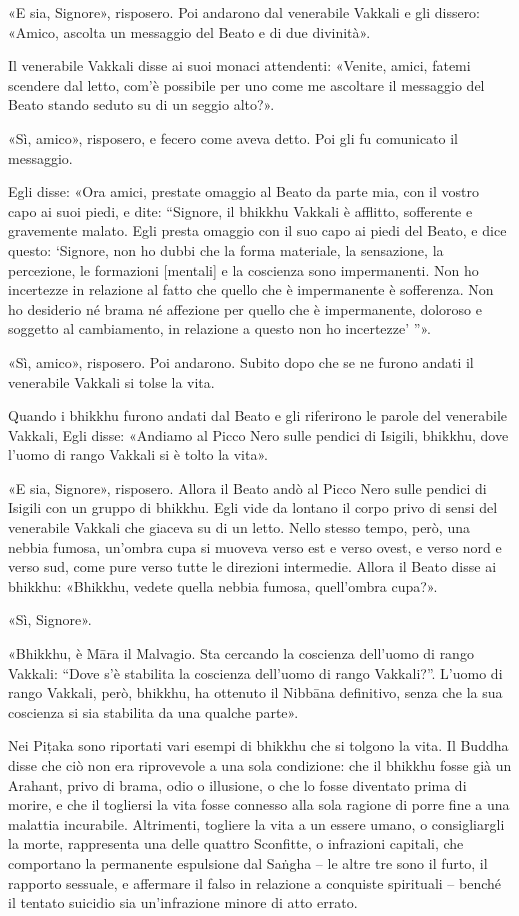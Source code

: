 «E sia, Signore», risposero. Poi andarono dal venerabile Vakkali e gli
dissero: «Amico, ascolta un messaggio del Beato e di due divinità».


Il venerabile Vakkali disse ai suoi monaci attendenti: «Venite, amici,
fatemi scendere dal letto, com’è possibile per uno come me ascoltare il
messaggio del Beato stando seduto su di un seggio alto?».


«Sì, amico», risposero, e fecero come aveva detto. Poi gli fu comunicato
il messaggio.


Egli disse: «Ora amici, prestate omaggio al Beato da parte mia, con il
vostro capo ai suoi piedi, e dite: “Signore, il bhikkhu Vakkali è
afflitto, sofferente e gravemente malato. Egli presta omaggio con il suo
capo ai piedi del Beato, e dice questo: ‘Signore, non ho dubbi che la
forma materiale, la sensazione, la percezione, le formazioni [mentali] e
la coscienza sono impermanenti. Non ho incertezze in relazione al fatto
che quello che è impermanente è sofferenza. Non ho desiderio né brama né
affezione per quello che è impermanente, doloroso e soggetto al
cambiamento, in relazione a questo non ho incertezze’ ”».


«Sì, amico», risposero. Poi andarono. Subito dopo che se ne furono
andati il venerabile Vakkali si tolse la vita.


Quando i bhikkhu furono andati dal Beato e gli riferirono le parole del
venerabile Vakkali, Egli disse: «Andiamo al Picco Nero sulle pendici di
Isigili, bhikkhu, dove l’uomo di rango Vakkali si è tolto la vita».


«E sia, Signore», risposero. Allora il Beato andò al Picco Nero sulle
pendici di Isigili con un gruppo di bhikkhu. Egli vide da lontano il
corpo privo di sensi del venerabile Vakkali che giaceva su di un letto.
Nello stesso tempo, però, una nebbia fumosa, un’ombra cupa si muoveva
verso est e verso ovest, e verso nord e verso sud, come pure verso tutte
le direzioni intermedie. Allora il Beato disse ai bhikkhu: «Bhikkhu,
vedete quella nebbia fumosa, quell’ombra cupa?».


«Sì, Signore».


«Bhikkhu, è Māra il Malvagio. Sta cercando la coscienza dell’uomo di
rango Vakkali: “Dove s’è stabilita la coscienza dell’uomo di rango
Vakkali?”. L’uomo di rango Vakkali, però, bhikkhu, ha ottenuto il
Nibbāna definitivo, senza che la sua coscienza si sia stabilita da una
qualche parte».




 Nei Piṭaka sono riportati vari esempi di bhikkhu che si
tolgono la vita. Il Buddha disse che ciò non era riprovevole a una sola
condizione: che il bhikkhu fosse già un Arahant, privo di brama, odio o
illusione, o che lo fosse diventato prima di morire, e che il togliersi
la vita fosse connesso alla sola ragione di porre fine a una malattia
incurabile. Altrimenti, togliere la vita a un essere umano, o
consigliargli la morte, rappresenta una delle quattro Sconfitte, o
infrazioni capitali, che comportano la permanente espulsione dal Saṅgha
– le altre tre sono il furto, il rapporto sessuale, e affermare il falso
in relazione a conquiste spirituali – benché il tentato suicidio sia
un’infrazione minore di atto errato.


